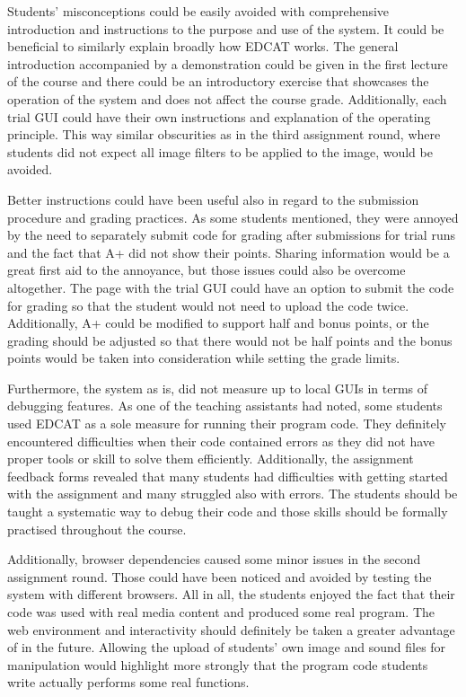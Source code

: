 Students' misconceptions could be easily avoided with comprehensive introduction and instructions to the purpose and use of the system. It could be beneficial to similarly explain broadly how EDCAT works. The general introduction accompanied by a demonstration could be given in the first lecture of the course and there could be an introductory exercise that showcases the operation of the system and does not affect the course grade. Additionally, each trial GUI could have their own instructions and explanation of the operating principle. This way similar obscurities as in the third assignment round, where students did not expect all image filters to be applied to the image, would be avoided.

Better instructions could have been useful also in regard to the submission procedure and grading practices. As some students mentioned, they were annoyed by the need to separately submit code for grading after submissions for trial runs and the fact that A+ did not show their points. Sharing information would be a great first aid to the annoyance, but those issues could also be overcome altogether. The page with the trial GUI could have an option to submit the code for grading so that the student would not need to upload the code twice. Additionally, A+ could be modified to support half and bonus points, or the grading should be adjusted so that there would not be half points and the bonus points would be taken into consideration while setting the grade limits.

Furthermore, the system as is, did not measure up to local GUIs in terms of debugging features. As one of the teaching assistants had noted, some students used EDCAT as a sole measure for running their program code. They definitely encountered difficulties when their code contained errors as they did not have proper tools or skill to solve them efficiently. Additionally, the assignment feedback forms revealed that many students had difficulties with getting started with the assignment and many struggled also with errors. The students should be taught a systematic way to debug their code and those skills should be formally practised throughout the course.

Additionally, browser dependencies caused some minor issues in the second assignment round. Those could have been noticed and avoided by testing the system with different browsers. All in all, the students enjoyed the fact that their code was used with real media content and produced some real program. The web environment and interactivity should definitely be taken a greater advantage of in the future. Allowing the upload of students' own image and sound files for manipulation would highlight more strongly that the program code students write actually performs some real functions.

